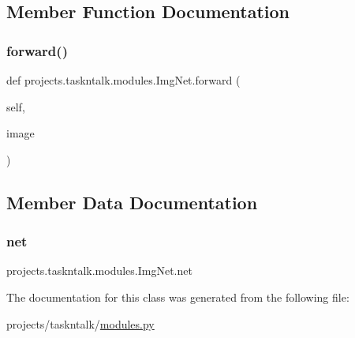 \subsection{Member Function Documentation}
\mbox{\label{classprojects_1_1taskntalk_1_1modules_1_1ImgNet_a6bdd1b350561c7fc3dce2be95b92fdb7}} 
\subsubsection{\texorpdfstring{forward()}{forward()}}
{\footnotesize\ttfamily def projects.\+taskntalk.\+modules.\+Img\+Net.\+forward (\begin{DoxyParamCaption}\item[{}]{self,  }\item[{}]{image }\end{DoxyParamCaption})}



\subsection{Member Data Documentation}
\mbox{\label{classprojects_1_1taskntalk_1_1modules_1_1ImgNet_ad2f75d9e18e4b10703db9f2ff3a988d2}} 
\subsubsection{\texorpdfstring{net}{net}}
{\footnotesize\ttfamily projects.\+taskntalk.\+modules.\+Img\+Net.\+net}



The documentation for this class was generated from the following file\+:\begin{DoxyCompactItemize}
\item 
projects/taskntalk/\hyperlink{projects_2taskntalk_2modules_8py}{modules.\+py}\end{DoxyCompactItemize}

